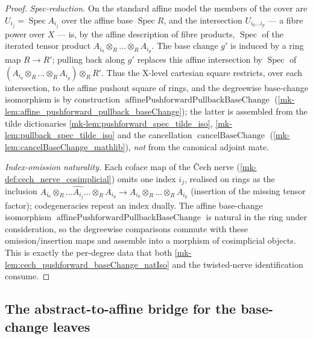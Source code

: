 \begin{proof}
  \emph{Spec-reduction.} On the standard affine model the members of the cover are
  \(U_{i_j} = \operatorname{Spec} A_{i_j}\) over the affine base \(\operatorname{Spec} R\),
  and the intersection \(U_{i_0\dots i_p}\) --- a fibre power over \(X\) --- is, by the
  affine description of fibre products, \(\operatorname{Spec}\) of the iterated tensor
  product \(A_{i_0} \otimes_R \dots \otimes_R A_{i_p}\). The base change \(g'\) is
  induced by a ring map \(R \to R'\); pulling back along \(g'\) replaces this affine
  intersection by \(\operatorname{Spec}\) of \((A_{i_0} \otimes_R \dots \otimes_R A_{i_p})
  \otimes_R R'\). Thus the X-level cartesian square restricts, over each intersection, to
  the affine pushout square of rings, and the degreewise base-change isomorphism is by
  construction \(\operatorname{affinePushforwardPullbackBaseChange}\)
  (\ref{mk-lem:affine_pushforward_pullback_baseChange}); the latter is assembled from the
  tilde dictionaries \ref{mk-lem:pushforward_spec_tilde_iso}, \ref{mk-lem:pullback_spec_tilde_iso}
  and the cancellation \(\operatorname{cancelBaseChange}\)
  (\ref{mk-lem:cancelBaseChange_mathlib}), \emph{not} from the canonical adjoint mate.

  \emph{Index-omission naturality.} Each coface map of the {\v C}ech nerve
  (\ref{mk-def:cech_nerve_cosimplicial}) omits one index \(i_j\), realised on rings as the
  inclusion \(A_{i_0} \otimes_R \dots \widehat{A_{i_j}} \dots \otimes_R A_{i_p} \to
  A_{i_0} \otimes_R \dots \otimes_R A_{i_p}\) (insertion of the missing tensor factor);
  codegeneracies repeat an index dually. The affine base-change isomorphism
  \(\operatorname{affinePushforwardPullbackBaseChange}\) is natural in the ring under
  consideration, so the degreewise comparisons commute with these omission/insertion
  maps and assemble into a morphism of cosimplicial objects. This is exactly the
  per-degree data that both \ref{mk-lem:cech_pushforward_baseChange_natIso} and the
  twisted-nerve identification consume.
\end{proof}

\subsection{The abstract-to-affine bridge for the base-change leaves}
\label{mk-sec:pushpull_tilde_bridge}

